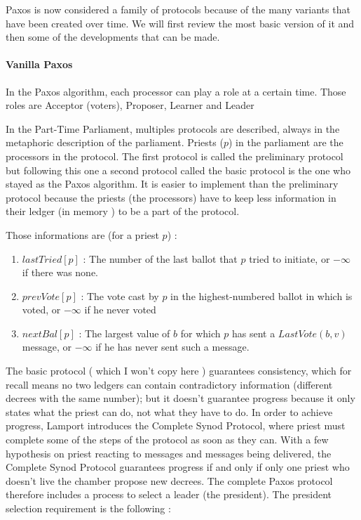 \documentclass[11pt, twocolumn]{article}
\begin{document}
Paxos is now considered a family of protocols because of the many variants that have been created over time. We will first review the most basic version of it and then some of the developments that can be made.

\paragraph{Vanilla Paxos}

In the Paxos algorithm, each processor can play a role at a certain time. Those roles are Acceptor (voters), Proposer, Learner and Leader

In the Part-Time Parliament, multiples protocols are described, always in the metaphoric description of the parliament. Priests ($p$) in the parliament are the processors in the protocol.
The first protocol is called the preliminary protocol but following this one a second protocol called the basic protocol is the one who stayed as the Paxos algorithm.
It is easier to implement than the preliminary protocol because  the priests (the processors) have to keep less information in their ledger (in memory ) to be a part of the protocol.

Those informations are (for a priest $p$) :
\begin{enumerate}
    \item $lastTried[p]$ : The number of the last ballot that $p$ tried to initiate, or $-\infty$ if there was none.
    \item $prevVote[p]$ : The vote cast by $p$ in the highest-numbered ballot in which is voted, or $-\infty$ if he never voted
    \item $nextBal[p]$ : The largest value of $b$ for which $p$ has sent a \(LastVote(b, v)\) message, or $-\infty$ if he has never sent such a message.
\end{enumerate}

The basic protocol ( which I won't copy here ) guarantees consistency, which for recall means no two ledgers can contain contradictory information (different decrees with the same number); but it doesn't guarantee progress because it only states what the priest can do, not what they have to do.
In order to achieve progress, Lamport introduces the Complete Synod Protocol, where priest must complete some of the steps of the protocol as soon as they can.
With a few hypothesis on priest reacting to messages and messages being delivered, the Complete Synod Protocol guarantees progress if and only if only one priest who doesn't live the chamber propose new decrees.
The complete Paxos protocol therefore includes a process to select a leader (the president). The president selection requirement is the following :
\end{document}
